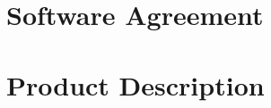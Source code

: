 \documentclass{book}
\begin{document}
\agreement

\chapter{Software Agreement}


\appendix

\chapter{Product Description}







\backmatter
\end{document}
